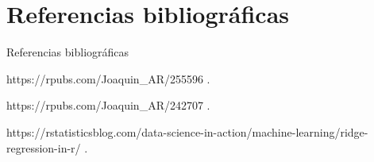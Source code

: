 \documentclass[11pt]{beamer}
\begin{document}
\section{Referencias bibliográficas}

\begin{frame}{Referencias bibliográficas}
	\begin{thebibliography}{10}

		\beamertemplateonlinebibitems %
		https://rpubs.com/Joaquin\_AR/255596
		.

		\beamertemplateonlinebibitems %
		https://rpubs.com/Joaquin\_AR/242707
		.

		\beamertemplateonlinebibitems %
		https://rstatisticsblog.com/data-science-in-action/machine-learning/ridge-regression-in-r/
		.


	\end{thebibliography}
\end{frame}
\end{document}
